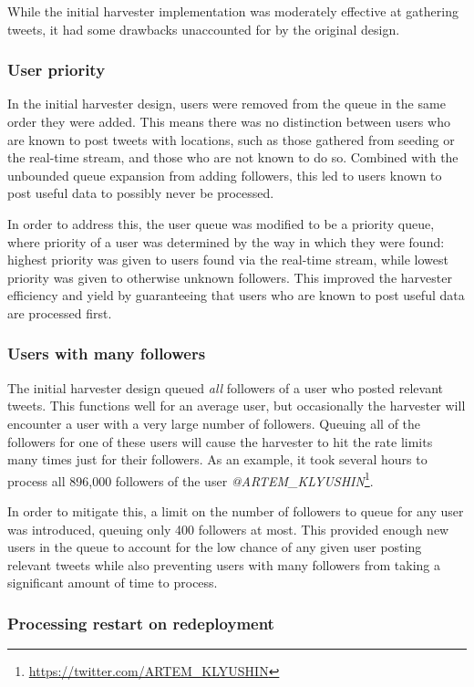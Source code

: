 While the initial harvester implementation was moderately effective at gathering tweets, it had some drawbacks unaccounted for by the original design.

\subsubsection{User priority}

In the initial harvester design, users were removed from the queue in the same order they were added. This means there was no distinction between users who are known to post tweets with locations, such as those gathered from seeding or the real-time stream, and those who are not known to do so. Combined with the unbounded queue expansion from adding followers, this led to users known to post useful data to possibly never be processed.

In order to address this, the user queue was modified to be a priority queue, where priority of a user was determined by the way in which they were found: highest priority was given to users found via the real-time stream, while lowest priority was given to otherwise unknown followers. This improved the harvester efficiency and yield by guaranteeing that users who are known to post useful data are processed first.

\subsubsection{Users with many followers}

The initial harvester design queued \textit{all} followers of a user who posted relevant tweets. This functions well for an average user, but occasionally the harvester will encounter a user with a very large number of followers. Queuing all of the followers for one of these users will cause the harvester to hit the rate limits many times just for their followers. As an example, it took several hours to process all 896,000 followers of the user \textit{@ARTEM\_KLYUSHIN}\footnote{\url{https://twitter.com/ARTEM_KLYUSHIN}}.

In order to mitigate this, a limit on the number of followers to queue for any user was introduced, queuing only 400 followers at most. This provided enough new users in the queue to account for the low chance of any given user posting relevant tweets while also preventing users with many followers from taking a significant amount of time to process.

\subsubsection{Processing restart on redeployment}

